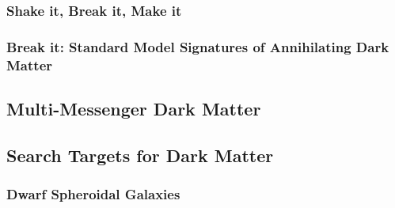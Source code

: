 \subsubsection{Shake it, Break it, Make it\label{sec:bop_it}}

\subsubsection{Break it: Standard Model Signatures of Annihilating Dark Matter\label{sec:break_it}}

\subsection{Multi-Messenger Dark Matter}

\subsection{Search Targets for Dark Matter\label{sec:dm_targets}}

\subsubsection{Dwarf Spheroidal Galaxies\label{sec:dSphs}}
